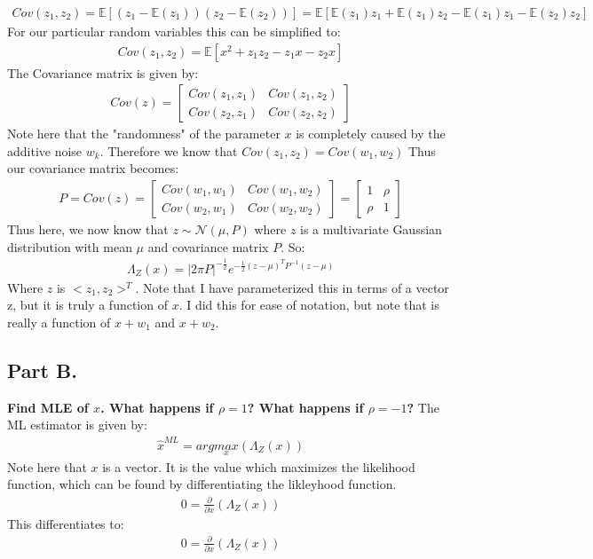\documentclass{article}
\begin{document}
\begin{align*}
Cov(z_1,z_2) = \mathbb{E} [ (z_1 - \mathbb{E}(z_1))(z_2 - \mathbb{E}(z_2)) ] = \mathbb{E} [\mathbb{E}(z_1)z_1 + \mathbb{E}(z_1)z_2 - \mathbb{E}(z_1)z_1 - \mathbb{E}(z_2)z_2 ]
\end{align*}
For our particular random variables this can be simplified to:
\begin{align*}
Cov(z_1,z_2) = \mathbb{E} [x^2 + z_1 z_2 - z_1 x - z_2 x]
\end{align*}
The Covariance matrix is given by:
\begin{align*}
Cov(z) = \begin{bmatrix}
Cov(z_1,z_1) & Cov(z_1,z_2) \\
Cov(z_2,z_1) & Cov(z_2,z_2)
\end{bmatrix}
\end{align*}
Note here that the "randomness" of the parameter $x$ is completely caused by the additive noise $w_k$. Therefore we know that $Cov(z_1,z_2)=Cov(w_1,w_2)$
Thus our covariance matrix becomes:
\begin{align*}
P = Cov(z) = \begin{bmatrix}
Cov(w_1,w_1) & Cov(w_1,w_2) \\
Cov(w_2,w_1) & Cov(w_2,w_2)
\end{bmatrix} = 
\begin{bmatrix}
1 & \rho \\
\rho & 1
\end{bmatrix}
\end{align*}
Thus here, we now know that $z \sim \mathcal{N}(\mu,P)$ where $z$ is a multivariate Gaussian distribution with mean $\mu$ and covariance matrix $P$. So:
\begin{align*}
\boxed{ \Lambda_Z (x) = |2\pi P|^{-\tfrac{1}{2}} e^{-\tfrac{1}{2} (z-\mu)^T P^{-1} (z-\mu)} }
\end{align*}
Where $z$ is $<z_1,z_2>^T$. Note that I have parameterized this in terms of a vector z, but it is truly a function of $x$. I did this for ease of notation, but note that is really a function of $x+w_1$ and $x+w_2$.
\clearpage

\subsection*{Part B.}
\textbf{Find MLE of $x$. What happens if $\rho=1$? What happens if $\rho = -1$?}
The ML estimator is given by:
\begin{align*}
\hat{x}^{ML} = arg \underset{x}{max} (\Lambda_Z(x))
\end{align*}
Note here that $x$ is a vector. It is the value which maximizes the likelihood function, which can be found by differentiating the likleyhood function.
\begin{align*}
0 = \frac{\partial}{\partial x}(\Lambda_Z(x))
\end{align*}
This differentiates to:
\begin{align*}
0 = \frac{\partial}{\partial x}(\Lambda_Z(x))
\end{align*}
\end{document}
